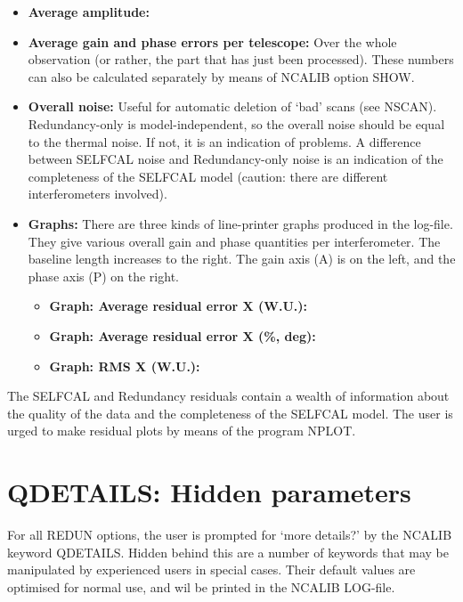\begin{itemize}  
\item   {\bf Average amplitude:}  

\item   {\bf Average gain and phase errors per telescope:}  
        Over the whole observation (or rather, the part that has just been
processed). These numbers can also be calculated separately by means of NCALIB
option SHOW.  

\item   {\bf Overall noise:}  
        Useful for automatic deletion of `bad' scans (see NSCAN).
Redundancy-only is model-independent, so the overall noise should be equal to
the thermal noise. If not, it is an indication of problems. A difference
between SELFCAL noise and Redundancy-only noise is an  indication of the
completeness of the SELFCAL model (caution: there are different interferometers
involved).  

\item   {\bf Graphs:}  
        There are three kinds of line-printer graphs produced in the log-file.
They give various overall gain and phase quantities per interferometer. The
baseline length increases to the right. The gain axis (A) is on the left, and
the phase axis (P) on the right.  
  \begin{itemize}  
  \item {\bf Graph: Average residual error X (W.U.):}  
  \item {\bf Graph: Average residual error X (\%, deg):}  
  \item {\bf Graph: RMS X (W.U.):}  
  \end{itemize} %
\end{itemize}  


        The SELFCAL and Redundancy residuals contain a wealth of information
about the quality of the data and the completeness of the SELFCAL model. The
user is urged to make residual plots by means of the program NPLOT.  


 
\section{QDETAILS: Hidden parameters}  
\label{.qdetails}  

        For all REDUN options, the user is prompted for `more details?' by the
NCALIB keyword QDETAILS.  Hidden behind this are a number of keywords that may
be manipulated by experienced users in special cases. Their default values are
optimised for normal use, and wil be printed in the NCALIB LOG-file.  

